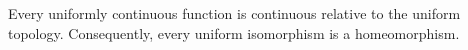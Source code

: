 Every uniformly continuous function is continuous relative to the uniform topology. Consequently, every uniform isomorphism is a homeomorphism.
